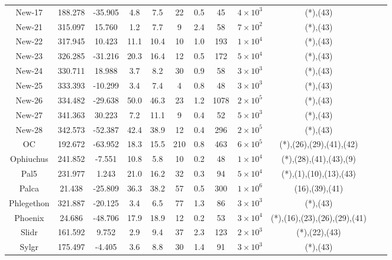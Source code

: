 \begin{table}
\begin{tabular}{cSSSScSccccc}
New-17 & 188.278 & -35.905 & 4.8 & 7.5 & 22 & 0.5 & 45 & $4 \times 10^{3}$ & (*),(43) \\
New-21 & 315.097 & 15.760 & 1.2 & 7.7 & 9 & 2.4 & 58 & $7 \times 10^{2}$ & (*),(43) \\
New-22 & 317.945 & 10.423 & 11.1 & 10.4 & 10 & 1.0 & 193 & $1 \times 10^{4}$ & (*),(43) \\
New-23 & 326.285 & -31.216 & 20.3 & 16.4 & 12 & 0.5 & 172 & $5 \times 10^{4}$ & (*),(43) \\
New-24 & 330.711 & 18.988 & 3.7 & 8.2 & 30 & 0.9 & 58 & $3 \times 10^{3}$ & (*),(43) \\
New-25 & 333.393 & -10.299 & 3.4 & 7.4 & 4 & 0.8 & 48 & $3 \times 10^{3}$ & (*),(43) \\
New-26 & 334.482 & -29.638 & 50.0 & 46.3 & 23 & 1.2 & 1078 & $2 \times 10^{5}$ & (*),(43) \\
New-27 & 341.363 & 30.223 & 7.2 & 11.1 & 9 & 0.4 & 52 & $5 \times 10^{3}$ & (*),(43) \\
New-28 & 342.573 & -52.387 & 42.4 & 38.9 & 12 & 0.4 & 296 & $2 \times 10^{5}$ & (*),(43) \\
OC & 192.672 & -63.952 & 18.3 & 15.5 & 210 & 0.8 & 463 & $6 \times 10^{5}$ & (*),(26),(29),(41),(42) \\
Ophiuchus & 241.852 & -7.551 & 10.8 & 5.8 & 10 & 0.2 & 48 & $1 \times 10^{4}$ & (*),(28),(41),(43),(9) \\
Pal5 & 231.977 & 1.243 & 21.0 & 16.2 & 32 & 0.3 & 94 & $5 \times 10^{4}$ & (*),(1),(10),(13),(43) \\
Palca & 21.438 & -25.809 & 36.3 & 38.2 & 57 & 0.5 & 300 & $1 \times 10^{6}$ & (16),(39),(41) \\
Phlegethon & 321.887 & -20.125 & 3.4 & 6.5 & 77 & 1.3 & 86 & $3 \times 10^{3}$ & (*),(43) \\
Phoenix & 24.686 & -48.706 & 17.9 & 18.9 & 12 & 0.2 & 53 & $3 \times 10^{4}$ & (*),(16),(23),(26),(29),(41) \\
Slidr & 161.592 & 9.752 & 2.9 & 9.4 & 37 & 2.3 & 123 & $2 \times 10^{3}$ & (*),(22),(43) \\
Sylgr & 175.497 & -4.405 & 3.6 & 8.8 & 30 & 1.4 & 91 & $3 \times 10^{3}$ & (*),(43) \\
\hline \hline
\end{tabular}
\end{table}

